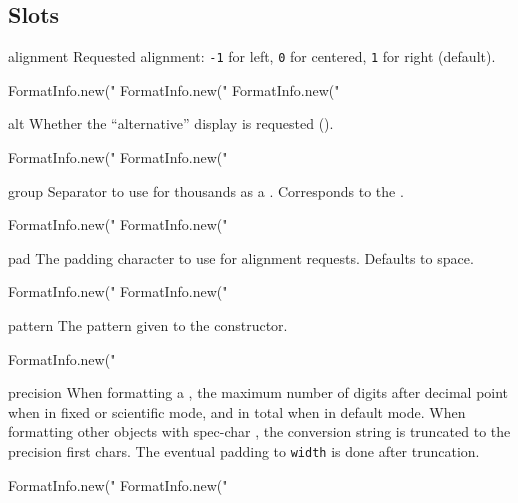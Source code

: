 \subsection{Slots}
\begin{urbiscriptapi}
\item[alignment]
  Requested alignment: \lstinline|-1| for left, \lstinline|0| for
  centered, \lstinline|1| for right (default).
\begin{urbiassert}
FormatInfo.new("%
FormatInfo.new("%
FormatInfo.new("%
\end{urbiassert}


\item[alt]
  Whether the ``alternative'' display is requested (\samp{\#}).
\begin{urbiassert}
FormatInfo.new("%
FormatInfo.new("%
\end{urbiassert}


\item[group]%
  Separator to use for thousands as a .  Corresponds to
  the  .
\begin{urbiassert}
FormatInfo.new("%
FormatInfo.new("%
\end{urbiassert}


\item[pad]
  The padding character to use for alignment requests.  Defaults to space.
\begin{urbiassert}
FormatInfo.new("%
FormatInfo.new("%
\end{urbiassert}


\item[pattern]
  The pattern given to the constructor.
\begin{urbiassert}
FormatInfo.new("%
\end{urbiassert}


\item[precision]
  When formatting a , the maximum number of digits
  after decimal point when in fixed or scientific mode, and in total
  when in default mode.  When formatting other objects with spec-char
  , the conversion string is truncated to the precision first
  chars. The eventual padding to \lstinline|width| is done after
  truncation.
\begin{urbiassert}
FormatInfo.new("%
FormatInfo.new("%
\end{urbiassert}



\end{urbiscriptapi}

